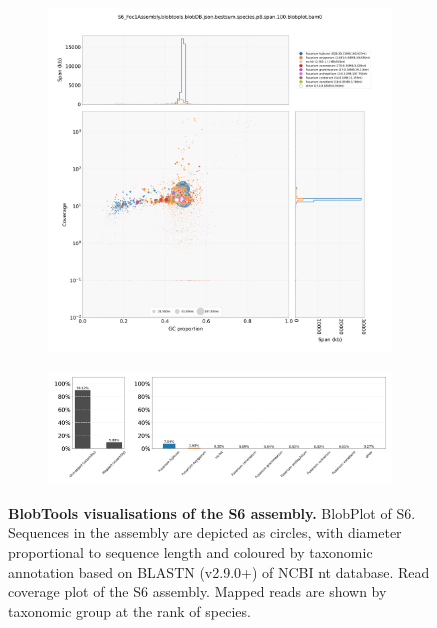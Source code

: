 \begin{figure}[hp!]
    \centering
    \begin{subfigure}[]{0.9\textwidth}
        \centering
        \includegraphics[width=\textwidth]{Appendices/S6_Foc1Assembly.blobtools.blobDB.json.bestsum.species.p8.span.100.blobplot.bam0.png}
        \caption{}
        \label{fig:BlobPlot-S6}
    \end{subfigure}
    \begin{subfigure}[]{0.9\textwidth}
        \centering
        \includegraphics[width=\textwidth]{Appendices/S6_Foc1Assembly.blobtools.blobDB.json.bestsum.species.p8.span.100.blobplot.read_cov.bam0.png}
        \caption{}
        \label{fig:BlobPlot_readcov-S6}
    \end{subfigure}
    \caption[BlobTools visualisations of the S6 assembly]{\textbf{BlobTools visualisations of the S6 assembly.}
         BlobPlot of S6. Sequences in the assembly are depicted as circles, with diameter proportional to sequence length and coloured by taxonomic annotation based on BLASTN (v2.9.0+) of NCBI nt database.
         Read coverage plot of the S6 assembly. Mapped reads are shown by taxonomic group at the rank of species.}
        \label{fig:S6:BlobTools}
\end{figure}



